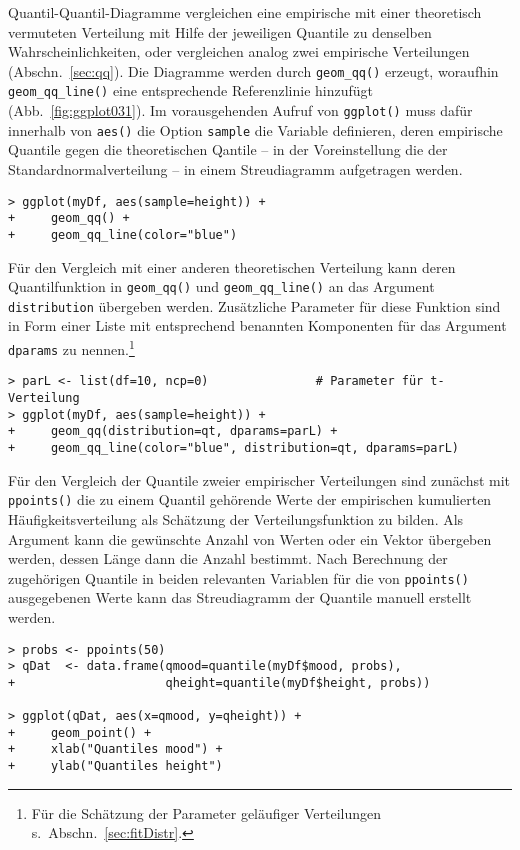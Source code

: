 Quantil-Quantil-Diagramme vergleichen eine empirische mit einer theoretisch vermuteten Verteilung mit Hilfe der jeweiligen Quantile zu denselben Wahrscheinlichkeiten, oder vergleichen analog zwei empirische Verteilungen (Abschn.\ \ref{sec:qq}). Die Diagramme werden durch \lstinline!geom_qq()! erzeugt, woraufhin \lstinline!geom_qq_line()! eine entsprechende Referenzlinie hinzufügt (Abb.\ \ref{fig:ggplot031}). Im vorausgehenden Aufruf von \lstinline!ggplot()! muss dafür innerhalb von \lstinline!aes()! die Option \lstinline!sample! die Variable definieren, deren empirische Quantile gegen die theoretischen Qantile -- in der Voreinstellung die der Standardnormalverteilung -- in einem Streudiagramm aufgetragen werden.
\begin{lstlisting}
> ggplot(myDf, aes(sample=height)) +
+     geom_qq() +
+     geom_qq_line(color="blue")
\end{lstlisting}

Für den Vergleich mit einer anderen theoretischen Verteilung kann deren Quantilfunktion in \lstinline!geom_qq()! und \lstinline!geom_qq_line()! an das Argument \lstinline!distribution! übergeben werden. Zusätzliche Parameter für diese Funktion sind in Form einer Liste mit entsprechend benannten Komponenten für das Argument \lstinline!dparams! zu nennen.\footnote{Für die Schätzung der Parameter geläufiger Verteilungen s.\ Abschn.\ \ref{sec:fitDistr}.}
\begin{lstlisting}
> parL <- list(df=10, ncp=0)               # Parameter für t-Verteilung
> ggplot(myDf, aes(sample=height)) +
+     geom_qq(distribution=qt, dparams=parL) +
+     geom_qq_line(color="blue", distribution=qt, dparams=parL)
\end{lstlisting}

Für den Vergleich der Quantile zweier empirischer Verteilungen sind zunächst mit \lstinline!ppoints()! die zu einem Quantil gehörende Werte der empirischen kumulierten Häufigkeitsverteilung als Schätzung der Verteilungsfunktion zu bilden. Als Argument kann die gewünschte Anzahl von Werten oder ein Vektor übergeben werden, dessen Länge dann die Anzahl bestimmt. Nach Berechnung der zugehörigen Quantile in beiden relevanten Variablen für die von \lstinline!ppoints()! ausgegebenen Werte kann das Streudiagramm der Quantile manuell erstellt werden.
\begin{lstlisting}
> probs <- ppoints(50)
> qDat  <- data.frame(qmood=quantile(myDf$mood, probs),
+                     qheight=quantile(myDf$height, probs))

> ggplot(qDat, aes(x=qmood, y=qheight)) +
+     geom_point() +
+     xlab("Quantiles mood") +
+     ylab("Quantiles height")
\end{lstlisting}

